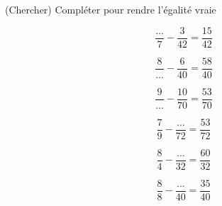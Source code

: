  (Chercher) Compléter pour rendre l'égalité vraie

\begin{multicols}{6}
$$\dfrac{\dots}{7}-\dfrac{ 3}{42}=\dfrac{15}{42}$$

$$\dfrac{8}{\dots}-\dfrac{ 6}{40}=\dfrac{58}{40}$$

$$\dfrac{9}{\dots}-\dfrac{ 10}{70}=\dfrac{53}{70}$$

$$\dfrac{7}{9}-\dfrac{ \dots}{72}=\dfrac{53}{72}$$

$$\dfrac{8}{4}-\dfrac{ \dots}{32}=\dfrac{60}{32}$$

$$\dfrac{8}{8}-\dfrac{ \dots}{40}=\dfrac{35}{40}$$

\end{multicols}